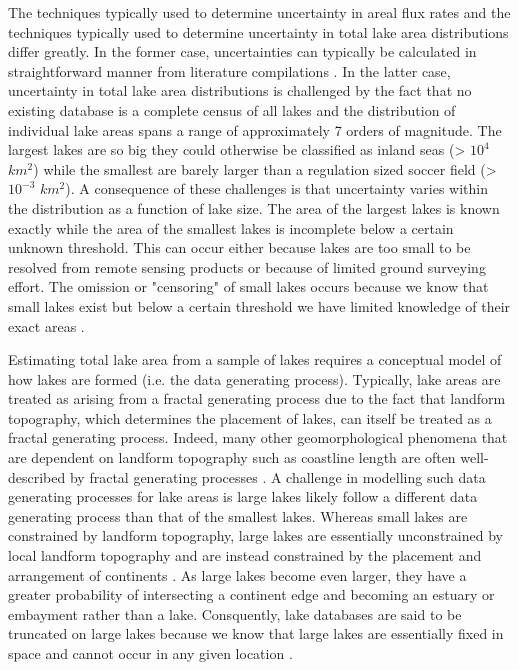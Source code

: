 \documentclass{article}
\begin{document}
The techniques typically used to determine uncertainty in areal flux rates and the techniques typically used to determine uncertainty in total lake area distributions differ greatly. In the former case, uncertainties can typically be calculated in straightforward manner from literature compilations \citep{delsontroGreenhouseGasEmissions2018, kellerGlobalCarbonBudget2021}. In the latter case, uncertainty in total lake area distributions is challenged by the fact that no existing database is a complete census of all lakes \citep{messagerEstimatingVolumeAge2016} and the distribution of individual lake areas spans a range of approximately 7 orders of magnitude. The largest lakes are so big they could otherwise be classified as inland seas (> $10^4$ $km^2$) while the smallest are barely larger than a regulation sized soccer field (> $10^{-3}$ $km^2$).
A consequence of these challenges is that uncertainty varies within the distribution as a function of lake size. The area of the largest lakes is known exactly while the area of the smallest lakes is incomplete below a certain unknown threshold. This can occur either because lakes are too small to be resolved from remote sensing products or because of limited ground surveying effort. The omission or "censoring" of small lakes occurs because we know that small lakes exist but below a certain threshold we have limited knowledge of their exact areas \citep{hamiltonEstimationFractalDimension1992}.

Estimating total lake area from a sample of lakes requires a conceptual model of how lakes are formed (i.e. the data generating process). Typically, lake areas are treated as arising from a fractal generating process due to the fact that landform topography, which determines the placement of lakes, can itself be treated as a fractal generating process. Indeed, many other geomorphological phenomena that are dependent on landform topography such as coastline length are often well-described by fractal generating processes \citep{newman_power_2005}. A challenge in modelling such data generating processes for lake areas is large lakes likely follow a different data generating process than that of the smallest lakes. Whereas small lakes are constrained by landform topography, large lakes are essentially unconstrained by local landform topography and are instead constrained by the placement and arrangement of continents \citep{goodchildLakesFractalSurfaces1988}. As large lakes become even larger, they have a greater probability of intersecting a continent edge and becoming an estuary or embayment rather than a lake. Consquently, lake databases are said to be truncated on large lakes because we know that large lakes are essentially fixed in space and cannot occur in any given location \citep{hamiltonEstimationFractalDimension1992}.
\end{document}
